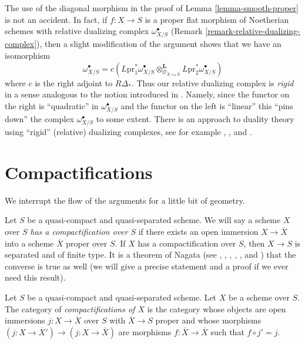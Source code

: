 \begin{remark}
\label{remark-van-den-bergh}
The use of the diagonal morphism in the proof of
Lemma \ref{lemma-smooth-proper} is not an accident.
In fact, if $f : X \to S$ is a proper flat morphism of
Noetherian schemes with relative
dualizing complex $\omega_{X/S}^\bullet$
(Remark \ref{remark-relative-dualizing-complex}), then
a slight modification of the argument shows that
we have
an isomorphism
$$
\omega_{X/S}^\bullet =
c\left(L\text{pr}_1^*\omega_{X/S}^\bullet
\otimes_{\mathcal{O}_{X \times_S X}}^\mathbf{L}
L\text{pr}_2^*\omega_{X/S}^\bullet\right)
$$
where $c$ is the right adjoint to $R\Delta_*$. Thus our relative dualizing
complex is {\it rigid} in a sense analogous to the notion introduced
in \cite{vdB-rigid}. Namely, since the functor on the right
is ``quadratic'' in $\omega_{X/S}^\bullet$ and the functor on the left
is ``linear'' this ``pins down'' the complex $\omega_{X/S}^\bullet$
to some extent. There is an approach to duality theory using
``rigid'' (relative) dualizing complexes, see for example
\cite{Neeman-rigid}, \cite{Yekutieli-rigid}, and \cite{Yekutieli-Zhang}.
\end{remark}









\section{Compactifications}
\label{section-compactify}

\noindent
We interrupt the flow of the arguments for a little bit of geometry.

\medskip\noindent
Let $S$ be a quasi-compact and quasi-separated scheme. We will say a
scheme $X$ over $S$ {\it has a compactification over $S$} if there exists
an open immersion $X \to \overline{X}$ into a scheme $\overline{X}$
proper over $S$. If $X$ has a compactification over $S$, then $X \to S$
is separated and of finite type. It is a theorem of Nagata (see
\cite{Lutkebohmert}, \cite{Conrad-Nagata}, \cite{Nagata-1},
\cite{Nagata-2}, \cite{Nagata-3}, and \cite{Nagata-4}) that the converse is
true as well (we will give a
precise statement and a proof if we ever need this result).

\medskip\noindent
Let $S$ be a quasi-compact and quasi-separated scheme.
Let $X$ be a scheme over $S$. The category
of {\it compactifications of $X$} is the category whose
objects are open immersions $j : X \to \overline{X}$ over $S$ with
$\overline{X} \to S$ proper and whose morphisms
$(j : X \to \overline{X}') \to (j : X \to \overline{X})$
are morphisms $f : \overline{X} \to \overline{X}$ such that
$f \circ j' = j$.

